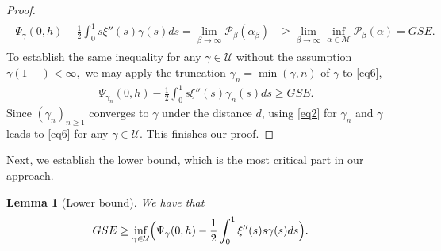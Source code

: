 \documentclass[12pt]{article}
\newtheorem{lemma}{\bf Lemma}
\newenvironment{Proof of lemma}{\noindent{\bf Proof of Lemma}}{\hfill$\Box$\newline}
\newenvironment{Proof of theorem}{\noindent{\bf Proof of Theorem}}{\hfill{\footnotesize${\square}$}\newline}
\newenvironment{Proof of theorems}{\noindent{\bf Proof of Theorems}}{\hfill$\Box$\newline}
\newenvironment{Proof of proposition}{\noindent{\bf Proof of Proposition}}{\hfill$\Box$\newline}
\newenvironment{Proof of propositions}{\noindent{\bf Proof of Propositions}}{\hfill$\Box$\newline}
\newenvironment{Proof of exercise}{\noindent{\it Proof of Exercise:}}{\hfill$\Box$}
\begin{document}
\begin{proof}
\begin{align}
	\begin{split}\label{eq6}
	\Psi_\gamma(0,h)-\frac{1}{2}\int_0^1s\xi''(s)\gamma(s)ds=\lim_{\beta\rightarrow\infty}\mathcal{P}_{\beta}(\alpha_\beta)&\geq \lim_{\beta\rightarrow\infty}\inf_{\alpha\in\mathcal{M}}\mathcal{P}_\beta(\alpha)=GSE.
	\end{split}
	\end{align}
	To establish the same inequality for any $\gamma\in\mathcal{U}$ without the assumption $\gamma(1-)<\infty,$ we may apply the truncation $\gamma_n=\min(\gamma,n)$ of $\gamma$ to \eqref{eq6},
	\begin{align*}
	\Psi_{\gamma_n}(0,h)-\frac{1}{2}\int_0^1s\xi''(s)\gamma_n(s)ds\geq GSE.
	\end{align*}
	Since $(\gamma_n)_{n\geq 1}$ converges to $\gamma$ under the distance $d$, using \eqref{eq2} for $\gamma_n$ and $\gamma$ leads to \eqref{eq6} for any $\gamma\in\mathcal{U}.$ This finishes our proof.
\end{proof}

    Next, we establish the lower bound, which is the most critical part in our approach.
    
\begin{lemma}[Lower bound]\label{lp}
	We have that
	\begin{align*}
	GSE&\geq \inf_{\gamma\in\mathcal{U}}\Bigl(\Psi_{\gamma}(0,h)-\frac{1}{2}\int_0^1\xi''(s)s\gamma(s)ds\Bigr).
	\end{align*}
\end{lemma}
\end{document}
